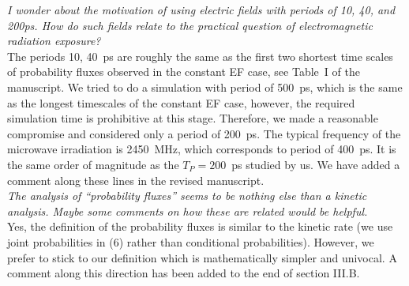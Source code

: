 \documentclass[]{revtex4-1}
\begin{document}
\emph{ I wonder about the motivation of using electric fields with
  periods of 10, 40, and 200ps. How do such fields relate to the
  practical question of electromagnetic radiation exposure?  }\\

The periods 10, 40~ps are roughly the same as the first two shortest
time scales of probability fluxes observed in the constant EF case,
see Table~I of the manuscript. We tried to do a simulation with period of
500~ps, which is the same as the longest timescales of the constant EF
case, however, the required simulation time is prohibitive at this stage. Therefore, we made a reasonable compromise and considered only
a period of 200~ps. The typical frequency of the microwave
irradiation is 2450~MHz, which corresponds to period of 400~ps. It is
the same order of magnitude as the $T_P=200$~ps studied by us.
We have added a comment along these lines in the revised manuscript.
\\

\emph{ The analysis of ``probability fluxes'' seems to be nothing else
  than a kinetic analysis. Maybe some comments on how these are
  related would be helpful.  }\\

Yes, the definition of the probability fluxes is similar to the
kinetic rate (we use joint probabilities in (6) rather than
conditional probabilities).
However, we prefer to stick to our definition which
is mathematically simpler and univocal.
A comment along this direction has been added to the end of section III.B.
\\
\end{document}

